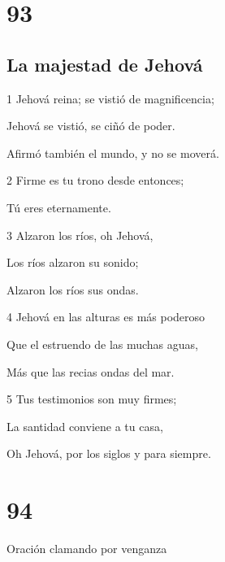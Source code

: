 \chapter{93}

\section*{La majestad de Jehová}

\par 1 Jehová reina; se vistió de magnificencia;
\par Jehová se vistió, se ciñó de poder.
\par Afirmó también el mundo, y no se moverá.
\par 2 Firme es tu trono desde entonces;
\par Tú eres eternamente.
\par 3 Alzaron los ríos, oh Jehová,
\par Los ríos alzaron su sonido;
\par Alzaron los ríos sus ondas.
\par 4 Jehová en las alturas es más poderoso
\par Que el estruendo de las muchas aguas,
\par Más que las recias ondas del mar.
\par 5 Tus testimonios son muy firmes;
\par La santidad conviene a tu casa,
\par Oh Jehová, por los siglos y para siempre.

\chapter{94}

\par Oración clamando por venganza

